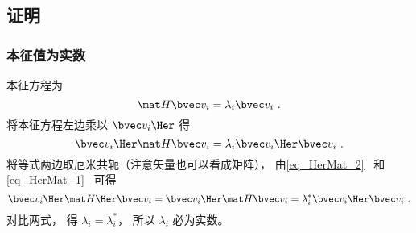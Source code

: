 


\subsection{证明}
\subsubsection{本征值为实数}
本征方程为
\begin{equation}
\mat H \bvec v_i = \lambda_i \bvec v_i~.
\end{equation}
将本征方程左边乘以 $\bvec v_i\Her$ 得
\begin{equation}
\bvec v_i\Her \mat H \bvec v_i = \lambda_i \bvec v_i\Her \bvec v_i~.
\end{equation}
将等式两边取厄米共轭（注意矢量也可以看成矩阵）， 由\autoref{eq_HerMat_2}~ 和\autoref{eq_HerMat_1}~ 可得
\begin{equation}
\bvec v_i\Her \mat H\Her \bvec v_i = \bvec v_i\Her \mat H \bvec v_i = \lambda_i^* \bvec v_i\Her \bvec v_i~.
\end{equation}
对比两式， 得 $\lambda_i = \lambda_i^*$， 所以 $\lambda_i$ 必为实数。

